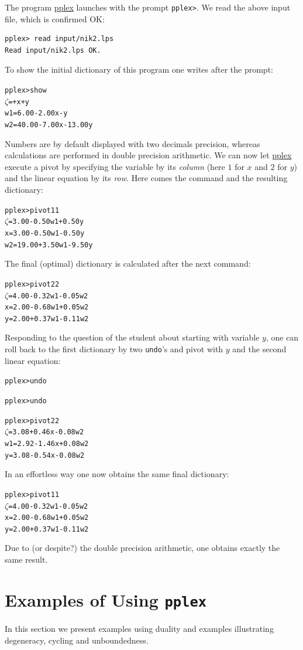 \documentclass[ukenglish]{nik}
\begin{document}
The program \url{pplex} launches with the prompt \verb|pplex>|.
We read the above input file, which is confirmed OK:
\begin{verbatim}
pplex> read input/nik2.lps
Read input/nik2.lps OK.
\end{verbatim}
To show the initial dictionary of this program one writes after the prompt:
\begin{alltt}
pplex> show
 \(\zeta\) =       +     x +      y
w1 =  6.00 - 2.00x -      y
w2 = 40.00 - 7.00x - 13.00y
\end{alltt}
Numbers are by default displayed with two decimals precision, whereas
calculations are performed in double precision arithmetic.
We can now let \url{pplex} execute a pivot by specifying
the variable by its \emph{column} (here $1$ for $x$ and $2$ for $y$)
and the linear equation by its \emph{row}. 
Here comes the command and the resulting dictionary:
\begin{alltt}
pplex> pivot 1 1
 \(\zeta\) =  3.00 - 0.50w1 + 0.50y
 x =  3.00 - 0.50w1 - 0.50y
w2 = 19.00 + 3.50w1 - 9.50y
\end{alltt}
The final (optimal) dictionary is calculated after the next command:
\begin{alltt}
pplex> pivot 2 2
 \(\zeta\) = 4.00 - 0.32w1 - 0.05w2
 x = 2.00 - 0.68w1 + 0.05w2
 y = 2.00 + 0.37w1 - 0.11w2
\end{alltt}
Responding to the question of the student about starting with variable $y$, 
one can roll back to the first dictionary by two \verb|undo|'s and pivot
with $y$ and the second linear equation:
\begin{alltt}
pplex> undo

pplex> undo

pplex> pivot 2 2
 \(\zeta\) = 3.08 + 0.46x - 0.08w2
w1 = 2.92 - 1.46x + 0.08w2
 y = 3.08 - 0.54x - 0.08w2
\end{alltt}
In an effortless way one now obtains the same final dictionary:
\begin{alltt}
pplex> pivot 1 1 
 \(\zeta\) = 4.00 - 0.32w1 - 0.05w2
 x = 2.00 - 0.68w1 + 0.05w2
 y = 2.00 + 0.37w1 - 0.11w2
\end{alltt}
Due to (or despite?) the double precision arithmetic, one obtains exactly the same result.

\section{Examples of Using \texttt{pplex}}\label{sec:examples}
In this section we present examples using duality and examples illustrating
degeneracy, cycling and unboundedness.
\end{document}
